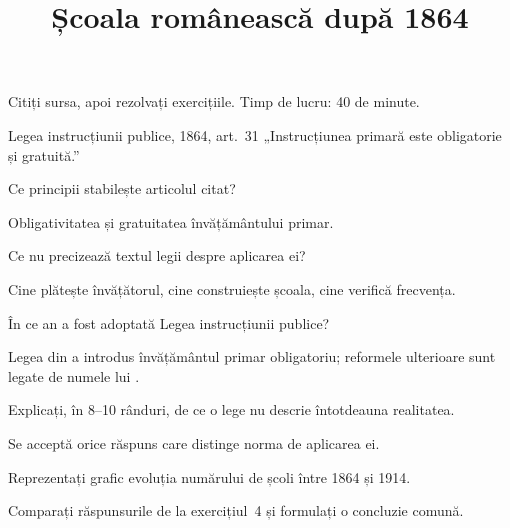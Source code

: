 \documentclass{texign-worksheet}
\title{Școala românească după 1864}
\date{}
\author{}
\begin{document}
\maketitle

\begin{instructions}
Citiți sursa, apoi rezolvați exercițiile. Timp de lucru: 40 de minute.
\end{instructions}

\begin{source}{Legea instrucțiunii publice, 1864, art.~31}
„Instrucțiunea primară este obligatorie și gratuită.”
\end{source}

\begin{exercise}[title=Înțelegerea sursei]
\begin{questions}
\question[2] Ce principii stabilește articolul citat?
\answerlines[2]
\begin{answer}
Obligativitatea și gratuitatea învățământului primar.
\end{answer}
\question[3] Ce nu precizează textul legii despre aplicarea ei?
\answerlines[3]
\begin{answer}
Cine plătește învățătorul, cine construiește școala, cine verifică frecvența.
\end{answer}
\end{questions}
\end{exercise}

\begin{exercise}[title=Alegere multiplă, points=1]
În ce an a fost adoptată Legea instrucțiunii publice?
\begin{choices}
\end{choices}
\end{exercise}

\begin{exercise}[title=Completare, points=2]
Legea din  a introdus învățământul primar obligatoriu; reformele ulterioare sunt legate de numele lui .
\end{exercise}

\begin{exercise}[title=Argumentare, points=20]
Explicați, în 8--10 rânduri, de ce o lege nu descrie întotdeauna realitatea.
\answerbox[45mm]
\begin{answer}
Se acceptă orice răspuns care distinge norma de aplicarea ei.
\end{answer}
\end{exercise}

\begin{exercise}[title=Schiță, points=2]
Reprezentați grafic evoluția numărului de școli între 1864 și 1914.
\answergrid[40mm]
\end{exercise}

\begin{activity}
Comparați răspunsurile de la exercițiul~4 și formulați o concluzie comună.
\end{activity}
\end{document}

